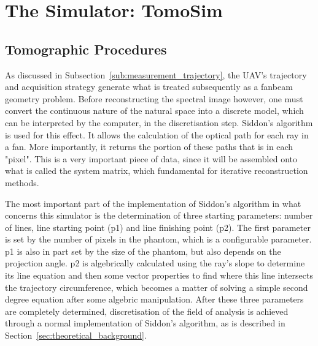 \section{The Simulator: TomoSim}%
\label{sec:the_simulator_tomosim}

\subsection{Tomographic Procedures}%
\label{sub:tomographic_procedures}

As discussed in Subsection~\ref{sub:measurement_trajectory}, the UAV's
trajectory and acquisition strategy generate what is treated
subsequently as a fanbeam geometry problem. Before reconstructing the
spectral image however, one must convert the continuous nature of the
natural space into a discrete model, which can be interpreted by the
computer, in the discretisation step. Siddon's algorithm is used for
this effect. It allows the calculation of the optical path for each ray
in a fan. More importantly, it returns the portion of these paths that
is in each "pixel". This is a very important piece of data, since it
will be assembled onto what is called the system matrix, which
fundamental for iterative reconstruction methods.

The most important part of the implementation of Siddon's algorithm in
what concerns this simulator is the determination of three starting
parameters: number of lines, line starting point (p1) and line finishing
point (p2). The first parameter is set by the number of pixels in the
phantom, which is a configurable parameter. p1 is also in part set by
the size of the phantom, but also depends on the projection angle. p2 is
algebrically calculated using the ray's slope to determine its line
equation and then some vector properties to find where this line
intersects the trajectory circumference, which becomes a matter of
solving a simple second degree equation after some algebric
manipulation. After these three parameters are completely determined,
discretisation of the field of analysis is achieved through a normal
implementation of Siddon's algorithm, as is described in
Section~\ref{sec:theoretical_background}.

